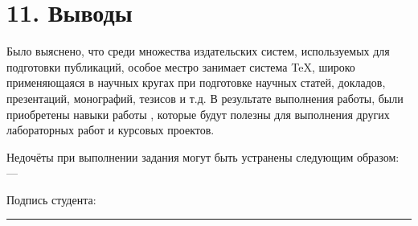 \documentclass[a4paper]{report} %
\begin{document}
\section*{11. Выводы}

Было выяснено, что среди множества издательских систем, используемых для подготовки публикаций, особое местро занимает система TeX, широко применяющаяся в научных кругах при подготовке научных статей, докладов, презентаций, монографий, тезисов и т.д. В результате выполнения работы, были приобретены навыки работы , которые будут полезны для выполнения других лабораторных работ и курсовых проектов.

Недочёты при выполнении задания могут быть устранены следующим образом: —

Подпись студента: \rule{60}{0.03}

\thispagestyle{empty}
\end{document}
